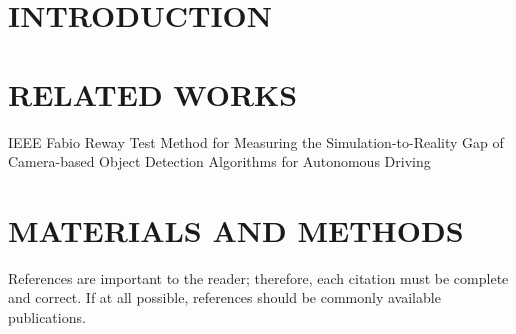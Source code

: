 \documentclass[letterpaper, 10 pt, conference]{ieeeconf}  %
\begin{document}
	\section{INTRODUCTION}
	
	
	

	\section{RELATED WORKS}
	IEEE Fabio Reway Test Method for Measuring the Simulation-to-Reality Gap of Camera-based Object Detection Algorithms for Autonomous Driving	

	
	
	\section{MATERIALS AND METHODS}
	
	
	
	
	
	
	
	
	
	

	
		
	
	References are important to the reader; therefore, each citation must be complete and correct. If at all possible, references should be commonly available publications.

	\addtolength{\textheight}{-12cm}    %

	{
	}
\end{document}
